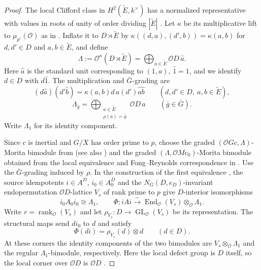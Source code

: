 \documentclass[11pt,a4paper]{article}
\theoremstyle{definition}
\theoremstyle{remark}
\numberwithin{equation}{section}
\newcommand{\cO}{\mathcal{O}}
\DeclareMathOperator{\End}{End}
\DeclareMathOperator{\GL}{GL}
\begin{document}
\begin{proof}
		The local Clifford class in $H^2(\widetilde E,k^\times)$ has a normalized
		representative with values in roots of unity of order dividing $|\widetilde E|$
		\cite[Proposition~1.2.9(ii)]{Linckelmann2018a}. Let $\kappa$ be its multiplicative lift to
		$\mu_{p'}(\cO)$ as in \cite[p.~6 of the arXiv version]{CoconetMarcusTodea2020}.
		Inflate it to $D\rtimes\widetilde E$ by
		$\kappa((d,a),(d',b))=\kappa(a,b)$ for
		$d,d'\in D$ and $a,b\in\widetilde E$, and define
		\[
		\Lambda:=\cO^\kappa(D\rtimes\widetilde E)
		=\bigoplus_{a\in\widetilde E}\cO D\,\widehat a.
		\]
		Here $\widehat a$ is the standard unit corresponding to $(1,a)$,
		$\widehat1=1$, and we identify $d\in D$ with $d\widehat1$.
		The multiplication and $\bar{G}$-grading are
		\[
		(d\widehat a)(d'\widehat b)
		=\kappa(a,b)d\,a(d')\widehat{ab}
		\qquad(d,d'\in D,\ a,b\in\widetilde E),
		\]
		\[
		\Lambda_{\bar g}
		=\bigoplus_{\substack{a\in\widetilde E\\\rho(a)=\bar g}}
		\cO D\,\widehat a
		\qquad(\bar g\in\bar{G}).
		\]
		Write $\Lambda_1$ for its identity component.
		
		Since $c$ is inertial and $G/X$ has order prime to $p$, choose the graded
		$(\cO Gc,\Lambda)$-Morita bimodule from \cite[Theorems~1.1(c) and~7.8(2)]{CoconetMarcusTodea2020}
		(see also \cite[Proposition~3.3]{Zhou2016}) and the graded $(\Lambda,\cO Mc_0)$-Morita bimodule obtained from the
		local equivalence and Fong--Reynolds correspondence in
		\cite[Corollary~7.7 and Proposition~4.3]{CoconetMarcusTodea2020}. Use the $\bar G$-grading
		induced by $\rho$. In the construction of the first equivalence
		\cite[proof of Theorem~7.8]{CoconetMarcusTodea2020}, the source idempotents $i\in A^D$,
		$i_0\in A_0^D$ and the $N_G(D,e_D)$-invariant endopermutation
		$\cO D$-lattice $V_s$ of rank prime to $p$ give $D$-interior isomorphisms
		\[
		i_0A_0i_0\cong\Lambda_1,\qquad
		\Phi:iAi\xrightarrow{\sim}\End_\cO(V_s)\otimes_\cO\Lambda_1.
		\]
		Write
		$r=\operatorname{rank}_\cO(V_s)$ and let
		$\rho_{V_s}:D\to\GL_\cO(V_s)$ be its representation.
		The structural maps send $di_0$ to $d$ and satisfy
		\begin{equation}\label{eq:source-interior-action}
			\Phi(di)=\rho_{V_s}(d)\otimes d\qquad(d\in D).
		\end{equation}
		At these corners the identity components of the two bimodules are
		$V_s\otimes_\cO\Lambda_1$ and the regular $\Lambda_1$-bimodule, respectively.
		Here the local defect group is $D$ itself, so the local corner over
		$\cO D$ is $\cO D$ \cite[Corollary~7.7]{CoconetMarcusTodea2020}.
		

\end{proof}
\end{document}
